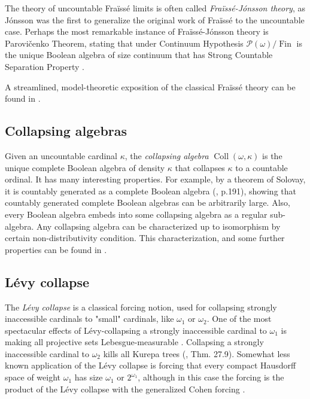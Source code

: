 \documentclass[11pt]{amsart}
\theoremstyle{definition}
\newcommand{\coll}{\operatorname{Coll}(\omega,\kappa)}
\begin{document}
The theory of uncountable Fra\"iss\'e limits is often called \emph{Fra\"iss\'e-J\'onsson theory}, as J\'onsson was the first to generalize the original work of Fra\"iss\'e to the uncountable case. Perhaps the most remarkable instance of Fra\"iss\'e-J\'onsson theory is Parovi\v{c}enko Theorem, stating that under Continuum Hypothesis $\mathcal{P}(\omega)/\operatorname{Fin}$ is the unique Boolean algebra of size continuum that has Strong Countable Separation Property \cite{parovicenko}.

A streamlined, model-theoretic exposition of the classical Fra\"iss\'e theory can be found in \cite{hodges}.



\subsection{Collapsing algebras}

Given an uncountable cardinal $\kappa$, the \emph{collapsing algebra} $\coll$ is the unique complete Boolean algebra of density $\kappa$ that collapses $\kappa$ to a countable ordinal. It has many interesting properties. For example, by a theorem of Solovay, it is countably generated as a complete Boolean algebra (\cite{bool}, p.191), showing that countably generated complete Boolean algebras can be arbitrarily large. Also, every Boolean algebra embeds into some collapsing algebra as a regular sub-algebra. Any collapsing algebra can be characterized up to isomorphism by certain non-distributivity condition. This characterization, and some further properties can be found in \cite{bool}.



\subsection{L\'evy collapse}

The \emph{L\'evy collapse} is a classical forcing notion, used for collapsing strongly inaccessible cardinals to "small" cardinals, like $\omega_1$ or $\omega_2$. One of the most spectacular effects of L\'evy-collapsing a strongly inaccessible cardinal to $\omega_1$ is making all projective sets Lebesgue-measurable \cite{b-j}. Collapsing a strongly inaccessible cardinal to $\omega_2$ kills all Kurepa trees (\cite{silver},\cite{jech} Thm. 27.9). Somewhat less known application of the L\'evy collapse is forcing that every compact Hausdorff space of weight $\omega_1$ has size $\omega_1$ or $2^{\omega_1}$, although in this case the forcing is the product of the L\'evy collapse with the generalized Cohen forcing \cite{juhas}.
\end{document}
